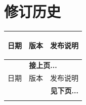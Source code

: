 \section*{修订历史}\label{revision-history}
\rhead{\Navigation}

\begin{longtable}[l]{ | m{2cm} | m{1.5cm} | m{12cm} | }\hline

    \rowcolor{lightgray}
    日期 & 版本 & \hypertarget{Release notes}{发布说明}\\\hline
    \endfirsthead

    \multicolumn{3}{c}{\bfseries 接上页...}\\\hline
    \rowcolor{lightgray}
    日期 & 版本 & 发布说明\\\hline
    \endhead

    \multicolumn{3}{r}{\textbf{见下页...}}\\
    \endfoot

    \endlastfoot


\end{longtable}

